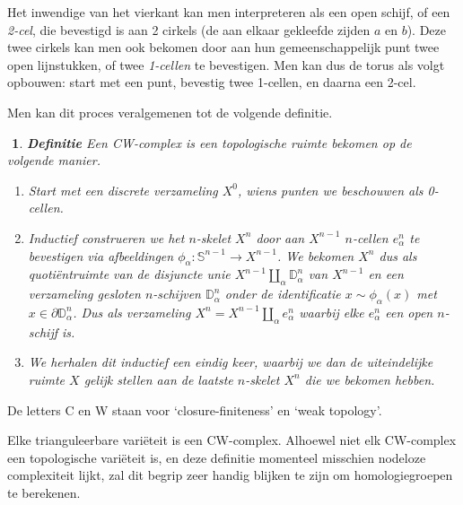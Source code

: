 \documentclass[12pt]{book}
\newtheorem{dfh}[stelh]{$\!\!$}
\newenvironment{df}{\begin{dfh} \em {\bf Definitie }}{\end{dfh}}
\begin{document}
\begin{center}
\end{center}


Het inwendige van het vierkant kan men interpreteren als een open schijf, of een \emph{2-cel}, die bevestigd is aan 2 cirkels (de aan elkaar gekleefde zijden $a$ en $b$). Deze twee cirkels kan men ook bekomen door aan hun gemeenschappelijk punt twee open lijnstukken, of twee \emph{1-cellen} te bevestigen. Men kan dus de torus als volgt opbouwen: start met een punt, bevestig twee 1-cellen, en daarna een 2-cel.

Men kan dit proces veralgemenen tot de volgende definitie.
\begin{df} Een \emph{CW-complex} is een topologische ruimte bekomen op de volgende manier.
\begin{enumerate}
\item Start met een discrete verzameling $X^0$, wiens punten we beschouwen als 0-cellen.
\item Inductief construeren we het \emph{$n$-skelet} $X^n$ door aan $X^{n-1}$ $n$-cellen $e
^n_\alpha$ te bevestigen via afbeeldingen $ \phi_\alpha: \mathbb{S}^{n-1} \to X^{n-1}$. We bekomen $X^n$ dus als quoti\"entruimte van de disjuncte unie $X^{n-1} \coprod_\alpha \mathbb{D}^n_\alpha$ van $X^{n-1}$ en een verzameling gesloten $n$-schijven  $\mathbb{D}^n_\alpha$ onder de identificatie $x \sim \phi_\alpha(x)$ met $x\in \partial \mathbb{D}^n_\alpha$. Dus als verzameling $X^n = X^{n-1} \coprod_\alpha e^n_\alpha$ waarbij elke $e^n_\alpha$ een open $n$-schijf is.
\item We herhalen dit inductief een eindig keer, waarbij we dan de uiteindelijke ruimte $X$ gelijk stellen aan de laatste  $n$-skelet $X^n$ die we bekomen hebben. 
\end{enumerate}
\end{df}

De letters C en W staan voor `closure-finiteness' en `weak topology'.


Elke trianguleerbare vari\"eteit is een CW-complex. Alhoewel niet elk CW-complex een topologische vari\"eteit is, en deze definitie momenteel misschien nodeloze complexiteit lijkt, zal dit begrip zeer handig blijken te zijn om homologiegroepen te berekenen.
\end{document}

